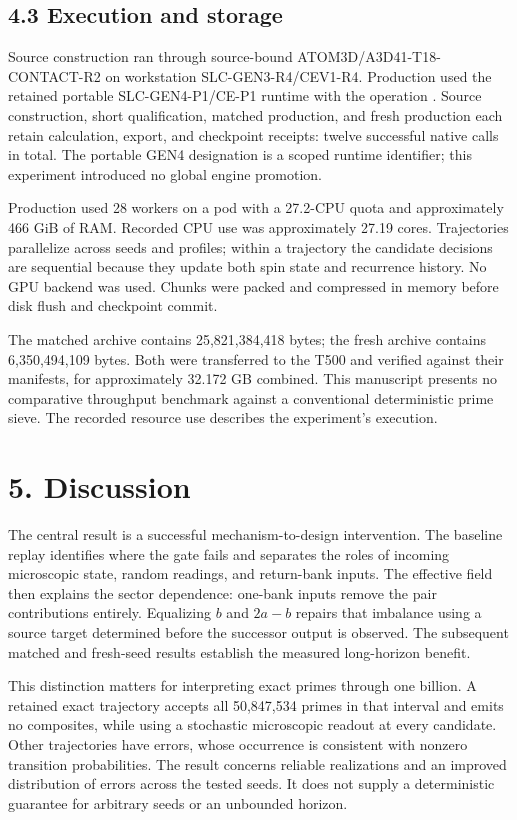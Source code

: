 \documentclass[
  11pt,
]{article}
\begin{document}
\subsection{4.3 Execution and storage}\label{execution-and-storage}

Source construction ran through source-bound ATOM3D/A3D41-T18-CONTACT-R2
on workstation SLC-GEN3-R4/CEV1-R4. Production used the retained
portable SLC-GEN4-P1/CE-P1 runtime with the operation
\texttt{}. Source construction, short
qualification, matched production, and fresh production each retain
calculation, export, and checkpoint receipts: twelve successful native
calls in total. The portable GEN4 designation is a scoped runtime
identifier; this experiment introduced no global engine promotion.

Production used 28 workers on a pod with a 27.2-CPU quota and
approximately 466 GiB of RAM. Recorded CPU use was approximately 27.19
cores. Trajectories parallelize across seeds and profiles; within a
trajectory the candidate decisions are sequential because they update
both spin state and recurrence history. No GPU backend was used. Chunks
were packed and compressed in memory before disk flush and checkpoint
commit.

The matched archive contains 25,821,384,418 bytes; the fresh archive
contains 6,350,494,109 bytes. Both were transferred to the T500 and
verified against their manifests, for approximately 32.172 GB combined.
This manuscript presents no comparative throughput benchmark against a
conventional deterministic prime sieve. The recorded resource use
describes the experiment's execution.

\section{5. Discussion}\label{discussion}

The central result is a successful mechanism-to-design intervention. The
baseline replay identifies where the gate fails and separates the roles
of incoming microscopic state, random readings, and return-bank inputs.
The effective field then explains the sector dependence: one-bank inputs
remove the pair contributions entirely. Equalizing \(b\) and \(2a-b\)
repairs that imbalance using a source target determined before the
successor output is observed. The subsequent matched and fresh-seed
results establish the measured long-horizon benefit.

This distinction matters for interpreting exact primes through one
billion. A retained exact trajectory accepts all 50,847,534 primes in
that interval and emits no composites, while using a stochastic
microscopic readout at every candidate. Other trajectories have errors,
whose occurrence is consistent with nonzero transition probabilities.
The result concerns reliable realizations and an improved distribution
of errors across the tested seeds. It does not supply a deterministic
guarantee for arbitrary seeds or an unbounded horizon.
\end{document}
